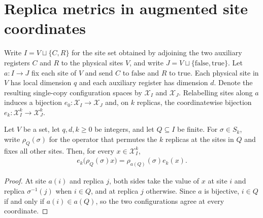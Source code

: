 \section{Replica metrics in augmented site coordinates}

Write $I=V\sqcup\{C,R\}$ for the site set obtained by adjoining the two
auxiliary registers $C$ and $R$ to the physical sites $V$, and write
$J=V\sqcup\{\mathrm{false},\mathrm{true}\}$.
Let $a:I\to J$ fix each site of $V$ and send $C$ to
$\mathrm{false}$ and $R$ to $\mathrm{true}$.
Each physical site in $V$ has local dimension $q$ and each auxiliary
register has dimension $d$. Denote the resulting single-copy configuration
spaces by $\mathcal X_I$ and $\mathcal X_J$. Relabelling sites along $a$
induces a bijection $e_0:\mathcal X_I\to\mathcal X_J$ and, on $k$ replicas,
the coordinatewise bijection $e_k:\mathcal X_I^k\to\mathcal X_J^k$.

\begin{lemma}
    \label{thm:al_augmented_subsystem_action}
    \leanok
    Let $V$ be a set, let $q,d,k\ge0$ be integers, and let $Q\subseteq I$
    be finite. For $\sigma\in S_k$, write $\rho_Q(\sigma)$ for the
    operator that permutes the $k$ replicas at the sites in $Q$ and fixes
    all other sites. Then, for every $x\in\mathcal X_I^k$,
    \begin{align*}
        e_k\bigl(\rho_Q(\sigma)x\bigr)=\rho_{a(Q)}(\sigma)e_k(x).
    \end{align*}
\end{lemma}
\begin{proof}\leanok
    At site $a(i)$ and replica $j$, both sides take the value of $x$
    at site $i$ and replica $\sigma^{-1}(j)$ when $i\in Q$, and at replica $j$
    otherwise. Since $a$ is bijective, $i\in Q$ if and only if
    $a(i)\in a(Q)$, so the two configurations agree at every coordinate.
\end{proof}

